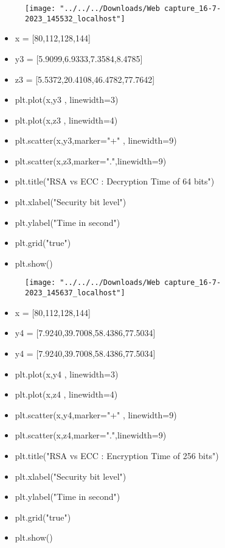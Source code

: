 \documentclass[12pt,a4paper]{article}
\begin{document}
	\begin{figure}[h]
		\centering
		\texttt{[image: "../../../Downloads/Web capture\_16-7-2023\_145532\_localhost"]}
	\end{figure}
	
	
	
	\newpage
	\begin{itemize}
		\item x = [80,112,128,144]
		\item y3 = [5.9099,6.9333,7.3584,8.4785]
		\item z3 = [5.5372,20.4108,46.4782,77.7642]
			\item plt.plot(x,y3 , linewidth=3)
		\item plt.plot(x,z3 , linewidth=4)
		\item plt.scatter(x,y3,marker="+" , linewidth=9)
		\item plt.scatter(x,z3,marker=".",linewidth=9)
		\item plt.title("RSA vs ECC : Decryption Time of 64 bits")
		\item plt.xlabel("Security bit level")
		\item plt.ylabel("Time in second")
		\item plt.grid("true")
		\item plt.show()
		
	\end{itemize}

	
\begin{figure}[h]
	\centering
	\texttt{[image: "../../../Downloads/Web capture\_16-7-2023\_145637\_localhost"]}
\end{figure}

	
	
	\newpage
	\begin{itemize}
		\item x = [80,112,128,144]
		\item y4 = [7.9240,39.7008,58.4386,77.5034]
		\item y4 = [7.9240,39.7008,58.4386,77.5034]
			\item plt.plot(x,y4 , linewidth=3)
		\item plt.plot(x,z4 , linewidth=4)
		\item plt.scatter(x,y4,marker="+" , linewidth=9)
		\item plt.scatter(x,z4,marker=".",linewidth=9)
		\item plt.title("RSA vs ECC : Encryption Time of 256 bits")
		\item plt.xlabel("Security bit level")
		\item plt.ylabel("Time in second")
		\item plt.grid("true")
		\item plt.show()
	\end{itemize}
	
\end{document}
